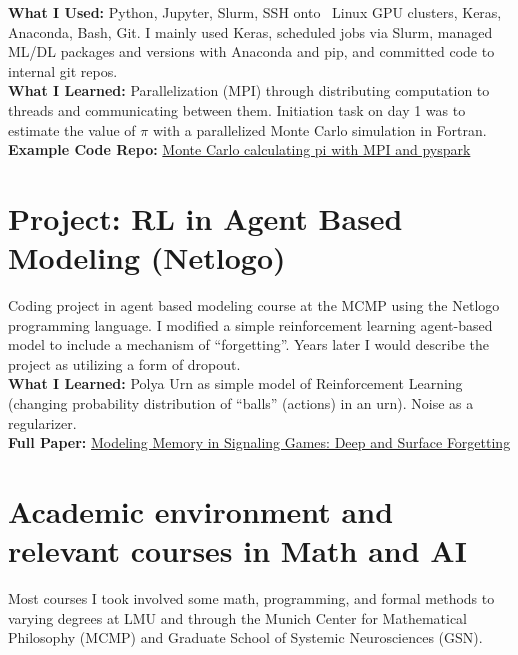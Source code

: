 \documentclass[11pt, oneside]{article}   	%
\begin{document}
\noindent \textbf{What I Used:} Python, Jupyter, Slurm, SSH onto \faLinux \  Linux GPU clusters, Keras, Anaconda, Bash, Git.  I mainly used Keras, scheduled jobs via Slurm, managed ML/DL packages and versions with Anaconda and pip, and committed code to internal git repos. \\

\noindent \textbf{What I Learned:}  Parallelization (MPI) through distributing computation to threads and communicating between them.  Initiation task on day 1 was to estimate the value of $\pi$ with a parallelized Monte Carlo simulation in Fortran.  \\

\noindent \textbf{Example Code Repo:} \href{https://github.com/CameronBeebe/Monte_Carlo}{Monte Carlo calculating pi with MPI and pyspark}







\section{Project: RL in Agent Based Modeling (Netlogo)}

Coding project in agent based modeling course at the MCMP using the Netlogo programming language.  I modified a simple reinforcement learning agent-based model to include a mechanism of ``forgetting''.  Years later I would describe the project as  utilizing a form of dropout. \\

\noindent \textbf{What I Learned:} Polya Urn as simple model of Reinforcement Learning (changing probability distribution of ``balls'' (actions) in an urn).  Noise as a regularizer. \\

\noindent \textbf{Full Paper:} \href{https://www.researchgate.net/publication/321228909_Modeling_Memory_in_Signaling_Games_Deep_and_Surface_Forgetting}{Modeling Memory in Signaling Games: Deep and Surface Forgetting}







\section{Academic environment and relevant courses in Math and AI}

Most courses I took involved some math, programming, and formal methods to varying degrees at LMU and through the Munich Center for Mathematical Philosophy (MCMP) and Graduate School of Systemic Neurosciences (GSN).  \\
\end{document}
